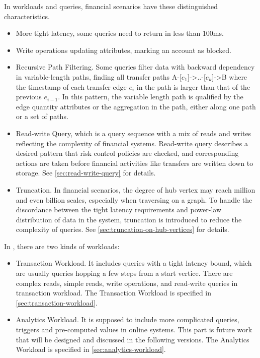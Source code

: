 In workloads and queries, financial scenarios have these distinguished characteristics.
\begin{itemize}
      \item More tight latency, \eg some queries need to return in less than 100ms.
      \item Write operations updating attributes, \eg marking an account as blocked.
      \item Recursive Path Filtering. Some queries filter data with backward dependency
            in variable-length paths, \eg finding all transfer paths A-[${e_1}$]->..-[${e_k}$]->B
            where the timestamp of each transfer edge ${e_i}$ in the path is larger than that of
            the previous ${e_{i-1}}$. In this pattern, the variable length path is qualified by
            the edge quantity attributes or the aggregation in the path, either along one path
            or a set of paths.
      \item Read-write Query, which is a query sequence with a mix of reads and writes reflecting the
            complexity of financial systems. Read-write query describes a desired pattern that risk control
            policies are checked, and corresponding actions are taken before financial activities like
            transfers are written down to storage. See \autoref{sec:read-write-query} for details.
      \item Truncation. In financial scenarios, the degree of hub vertex may reach million and even
            billion scales, especially when traversing on a graph. To handle the discordance between the tight
            latency requirements and power-law distribution of data in the system, truncation is introduced
            to reduce the complexity of queries. See \autoref{sec:truncation-on-hub-vertices} for details.
\end{itemize}

In \ldbcfinbench, there are two kinds of workloads:
\begin{itemize}
      \item Transaction Workload. It includes queries with a tight latency bound, which are usually
            queries hopping a few steps from a start vertice. There are complex reads, simple reads, write
            operations, and read-write queries in transaction workload. The Transaction Workload is specified
            in \autoref{sec:transaction-workload}.
      \item Analytics Workload. It is supposed to include more complicated queries, \eg triggers and pre-computed
            values in online systems. This part is future work that will be designed and discussed in the
            following versions. The Analytics Workload is specified in \autoref{sec:analytics-workload}.
\end{itemize}


